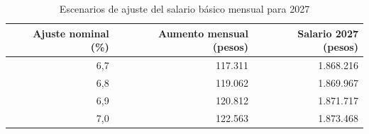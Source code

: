 \begin{table}[H]
\centering\small
\caption{Escenarios de ajuste del salario básico mensual para 2027}
\label{tab:escenarios}
\begin{tabular}{rrr}
\toprule
Ajuste nominal (\%) & Aumento mensual (pesos) & Salario 2027 (pesos)\\
\midrule
6,7 & 117.311 & 1.868.216 \\
6,8 & 119.062 & 1.869.967 \\
6,9 & 120.812 & 1.871.717 \\
7,0 & 122.563 & 1.873.468 \\
\bottomrule
\end{tabular}
\end{table}
